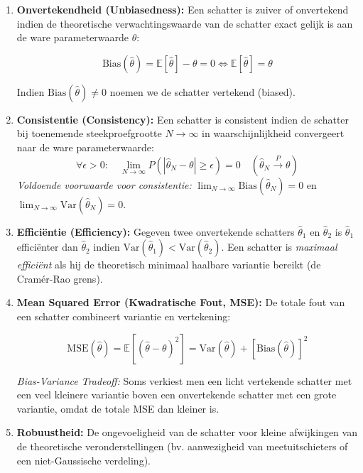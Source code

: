 \documentclass[11pt,a4paper]{article}
\newcommand{\E}{\mathbb{E}}
\newcommand{\Var}{\text{Var}}
\newcommand{\Bias}{\text{Bias}}
\newcommand{\MSE}{\text{MSE}}
\begin{document}
\begin{enumerate}[leftmargin=1.5em]
    \item \textbf{Onvertekendheid (Unbiasedness):}
    Een schatter is zuiver of onvertekend indien de theoretische verwachtingswaarde van de schatter exact gelijk is aan de ware parameterwaarde $\theta$:
    \begin{formulabox}
    \begin{equation}
        \Bias(\hat{\theta}) = \E[\hat{\theta}] - \theta = 0 \iff \E[\hat{\theta}] = \theta
    \end{equation}
    \end{formulabox}
    Indien $\Bias(\hat{\theta}) \neq 0$ noemen we de schatter vertekend (biased).

    \item \textbf{Consistentie (Consistency):}
    Een schatter is consistent indien de schatter bij toenemende steekproefgrootte $N \to \infty$ in waarschijnlijkheid convergeert naar de ware parameterwaarde:
    \begin{equation}
        \forall \epsilon > 0: \quad \lim_{N \to \infty} P(|\hat{\theta}_N - \theta| \ge \epsilon) = 0 \quad (\hat{\theta}_N \xrightarrow{P} \theta)
    \end{equation}
    \emph{Voldoende voorwaarde voor consistentie:} $\lim_{N \to \infty} \Bias(\hat{\theta}_N) = 0$ en $\lim_{N \to \infty} \Var(\hat{\theta}_N) = 0$.

    \item \textbf{Efficiëntie (Efficiency):}
    Gegeven twee onvertekende schatters $\hat{\theta}_1$ en $\hat{\theta}_2$ is $\hat{\theta}_1$ efficiënter dan $\hat{\theta}_2$ indien $\Var(\hat{\theta}_1) < \Var(\hat{\theta}_2)$. Een schatter is \emph{maximaal efficiënt} als hij de theoretisch minimaal haalbare variantie bereikt (de Cramér-Rao grens).

    \item \textbf{Mean Squared Error (Kwadratische Fout, MSE):}
    De totale fout van een schatter combineert variantie en vertekening:
    \begin{formulabox}
    \begin{equation}
        \MSE(\hat{\theta}) = \E[(\hat{\theta} - \theta)^2] = \Var(\hat{\theta}) + \left[ \Bias(\hat{\theta}) \right]^2
    \end{equation}
    \end{formulabox}
    \emph{Bias-Variance Tradeoff:} Soms verkiest men een licht vertekende schatter met een veel kleinere variantie boven een onvertekende schatter met een grote variantie, omdat de totale MSE dan kleiner is.

    \item \textbf{Robuustheid:}
    De ongevoeligheid van de schatter voor kleine afwijkingen van de theoretische veronderstellingen (bv. aanwezigheid van meetuitschieters of een niet-Gaussische verdeling).
\end{enumerate}
\end{document}
